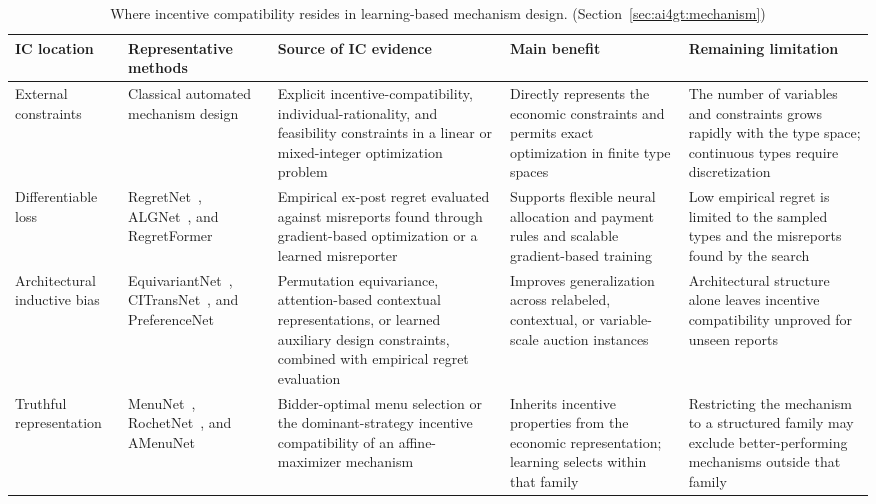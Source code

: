 \begin{table}[pos=t]
\centering
\caption{Where incentive compatibility resides in learning-based mechanism design.
(Section~\ref{sec:ai4gt:mechanism})}
\label{tab:ic_location_mechanism_design}
\footnotesize
\setlength{\tabcolsep}{3.5pt}
\renewcommand{\arraystretch}{1.25}

\begin{tabularx}{\textwidth}{
    >{\raggedright\arraybackslash}p{}
    >{\raggedright\arraybackslash}p{}
    Y
    Y
    Y
}
\toprule
\textbf{IC location}
&
\textbf{Representative methods}
&
\textbf{Source of IC evidence}
&
\textbf{Main benefit}
&
\textbf{Remaining limitation}
\\
\midrule

External constraints
&
Classical automated mechanism design~\citep{ConitzerSandholm2002,CurryAMDSurvey2025}
&
Explicit incentive-compatibility, individual-rationality, and feasibility constraints in a linear or mixed-integer optimization problem
&
Directly represents the economic constraints and permits exact optimization in finite type spaces
&
The number of variables and constraints grows rapidly with the type space; continuous types require discretization
\\

\addlinespace

Differentiable loss
&
RegretNet~\citep{Duetting2019}, ALGNet~\citep{Rahme2021Auction}, and RegretFormer~\citep{Ivanov2022}
&
Empirical ex-post regret evaluated against misreports found through gradient-based optimization or a learned misreporter
&
Supports flexible neural allocation and payment rules and scalable gradient-based training
&
Low empirical regret is limited to the sampled types and the misreports found by the search
\\

\addlinespace

Architectural inductive bias
&
EquivariantNet~\citep{Rahme2021Equivariant}, CITransNet~\citep{Duan2022}, and PreferenceNet~\citep{Peri2021}
&
Permutation equivariance, attention-based contextual representations, or learned auxiliary design constraints, combined with empirical regret evaluation
&
Improves generalization across relabeled, contextual, or variable-scale auction instances
&
Architectural structure alone leaves incentive compatibility unproved for unseen reports
\\

\addlinespace

Truthful representation
&
MenuNet~\citep{Shen2019}, RochetNet~\citep{Duetting2019}, and AMenuNet~\citep{Duan2023}
&
Bidder-optimal menu selection or the dominant-strategy incentive compatibility of an affine-maximizer mechanism
&
Inherits incentive properties from the economic representation; learning selects within that family
&
Restricting the mechanism to a structured family may exclude better-performing mechanisms outside that family
\\


\end{tabularx}
\end{table}
